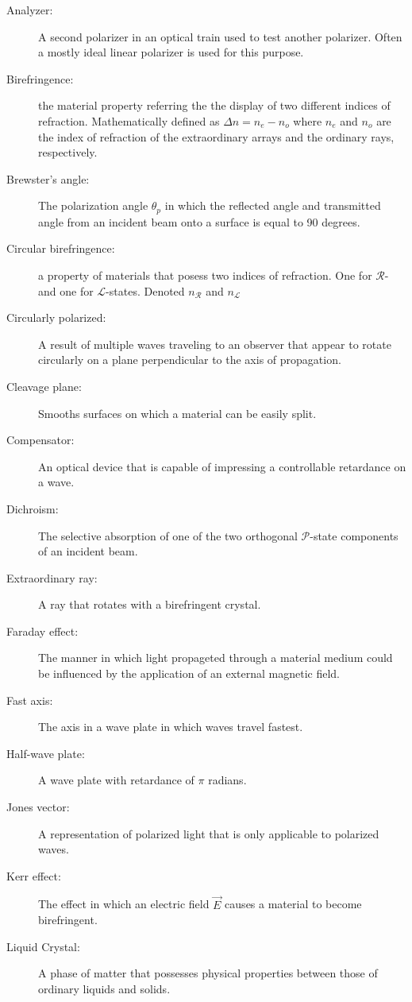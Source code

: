 \documentclass[12pt]{report}
\begin{document}
\begin{description}
\item[Analyzer: ] A second polarizer in an optical train used to test another polarizer. Often a mostly ideal linear polarizer is used for this purpose. 
\item[Birefringence: ] the material property referring the the display of two different indices of refraction. Mathematically defined as $\Delta n = n_e - n_o$ where $n_e$ and $n_o$ are the index of refraction of the extraordinary arrays and the ordinary rays, respectively. 
\item[Brewster's angle: ] The polarization angle $\theta_p$ in which the reflected angle and transmitted angle from an incident beam onto a surface is equal to 90 degrees. 
\item[Circular birefringence: ] a property of materials that posess two indices of refraction. One for $\mathcal{R}$- and one for $\mathcal{L}$-states. Denoted $n_\mathcal{R}$ and $n_\mathcal{L}$
\item[Circularly polarized: ] A result of multiple waves traveling to an observer that appear to rotate circularly on a plane perpendicular to the axis of propagation. 
\item[Cleavage plane: ] Smooths surfaces on which a material can be easily split.
\item[Compensator: ] An optical device that is capable of impressing a controllable retardance on a wave.
\item[Dichroism: ] The selective absorption of one of the two orthogonal $\mathcal{P}$-state components of an incident beam.
\item[Extraordinary ray: ] A ray that rotates with a birefringent crystal. 
\item[Faraday effect: ]The manner in which light propageted through a material medium could be influenced by the application of an external magnetic field. 
\item[Fast axis: ] The axis in a wave plate in which waves travel fastest. 
\item[Half-wave plate: ] A wave plate with retardance of $\pi$ radians.
\item[Jones vector: ] A representation of polarized light that is only applicable to polarized waves. 
\item[Kerr effect: ] The effect in which an electric field $\vec{E}$ causes a material to become birefringent. 
\item[Liquid Crystal: ] A phase of matter that possesses physical properties between those of ordinary liquids and solids. 

\end{description}
\end{document}
